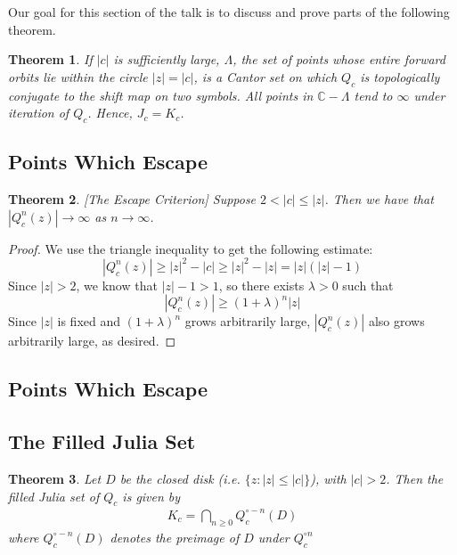 \documentclass[symmetric]{tufte-handout}
\newtheorem{theorem}{Theorem}
\begin{document}
Our goal for this section of the talk is to discuss and prove parts of
the following theorem.


\begin{theorem}
If $|c|$ is sufficiently large, $\Lambda$, the set of points whose entire forward orbits lie within the circle $|z|=|c|$, is a Cantor set on which $Q_c$ is topologically conjugate to the shift map on two symbols. All points in $\mathbb{C} - \Lambda$ tend to $\infty$ under iteration of $Q_c$. Hence, $J_c=K_c$.
\end{theorem}



\subsection{Points Which Escape}



\begin{theorem} \label{escape} [The Escape Criterion]
Suppose $2 < |c| \le |z|$. Then we have that $|Q_c^n(z)| \rightarrow \infty$ as $n \rightarrow \infty$.

\end{theorem}
\begin{proof}
We use the triangle inequality to get the following estimate:
\begin{equation}
    |Q_c^n(z)| \geq |z|^2 - |c| \geq |z|^2 - |z| = |z|(|z|-1)
\end{equation}
Since $|z| > 2$, we know that $|z|-1>1$, so there exists $\lambda > 0$ such that 
\begin{equation}
    |Q_c^n(z)| \geq (1+\lambda)^n|z|
\end{equation}
Since $|z|$ is fixed and $(1+\lambda)^n$ grows arbitrarily large, $|Q_c^n(z)|$ also grows arbitrarily large, as desired.

\end{proof}




\subsection{Points Which Escape}




\subsection{The Filled Julia Set}

\begin{theorem}
Let $D$ be the closed disk (i.e. $\{z : |z| \le |c|\}$), with $|c|>2$. Then the filled Julia set of $Q_c$ is given by
\begin{align*}
K_c = \bigcap\limits_{n\ge 0} Q_c^{\circ -n} (D)
\end{align*}
where $Q_c^{\circ -n} (D)$ denotes the preimage of $D$ under $Q_c^{\circ n}$
\end{theorem}
\end{document}
